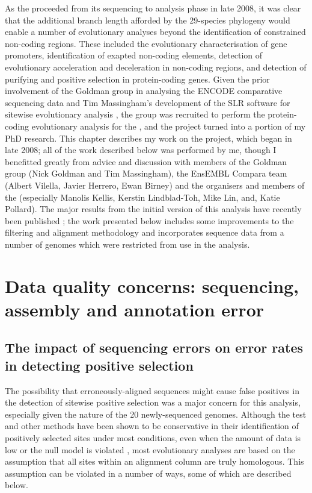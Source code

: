 As the \mgp proceeded from its sequencing to analysis phase in late
2008, it was clear that the additional branch length afforded by the
29-species phylogeny would enable a number of evolutionary analyses
beyond the identification of constrained non-coding regions. These
included the evolutionary characterisation of gene promoters,
identification of exapted non-coding elements, detection of
evolutionary acceleration and deceleration in non-coding regions, and
detection of purifying and positive selection in protein-coding
genes. Given the prior involvement of the Goldman group in analysing
the ENCODE comparative sequencing data
\citep{Margulies2007,ENCODE_Project_Consortium2007a} and Tim
Massingham's development of the SLR software for sitewise evolutionary
analysis \citep{Massingham2005}, the group was recruited to perform
the protein-coding evolutionary analysis for the \mgp, and the project
turned into a portion of my PhD research. This chapter describes my
work on the project, which began in late 2008; all of the work
described below was performed by me, though I benefitted greatly from
advice and discussion with members of the Goldman group (Nick Goldman
and Tim Massingham), the EnsEMBL Compara team (Albert Vilella, Javier
Herrero, Ewan Birney) and the organisers and members of the \mgp
(especially Manolis Kellis, Kerstin Lindblad-Toh, Mike Lin, and, Katie
Pollard). The major results from the initial version of this analysis
have recently been published \citep{LindbladToh2011}; the work
presented below includes some improvements to the filtering and
alignment methodology and incorporates sequence data from a number of
genomes which were restricted from use in the \mgp analysis.

\section{Data quality concerns: sequencing, assembly and annotation error}

\subsection{The impact of sequencing errors on error rates in detecting positive selection}
\label{section_error_impact}

The possibility that erroneously-aligned sequences might cause false
positives in the detection of sitewise positive selection was a major
concern for this analysis, especially given the \lcv nature of the 20
newly-sequenced genomes. Although the \slr test and other \sw \ml
methods have been shown to be conservative in their identification of
positively selected sites under most conditions, even when the amount
of data is low or the null model is violated
\citep{Anisimova2002,Anisimova2003,Massingham2005}, most evolutionary
analyses are based on the assumption that all sites within an
alignment column are truly homologous. This assumption can be violated
in a number of ways, some of which are described below.

